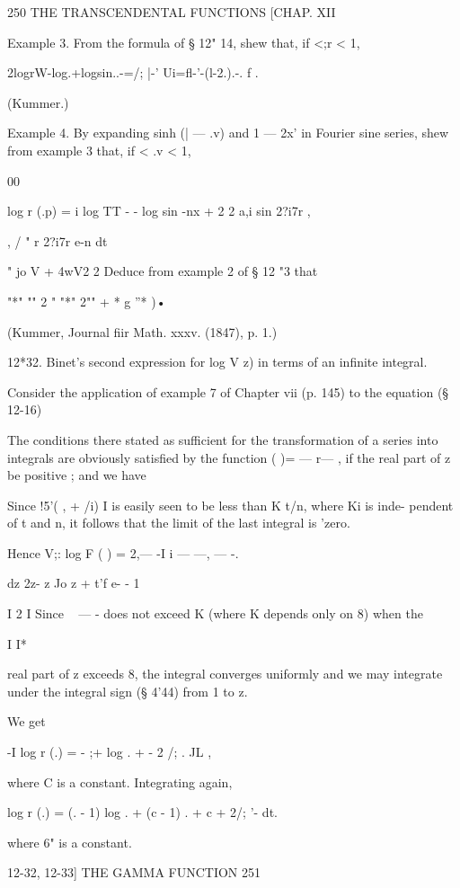250 THE TRANSCENDENTAL FUNCTIONS [CHAP. XII 

Example 3. From the formula of § 12" 14, shew that, if <;r < 1, 

2logrW-log.+logsin..-=/; |-' Ui=fl-'-(l-2.).-. f . 

(Kummer.) 

Example 4. By expanding sinh (| — .v)  and 1 — 2x' in Fourier sine series, shew from 
example 3 that, if < .v < 1, 

00 

log r (.p) = i log TT - -  log sin -nx + 2 2 a,i sin 2?i7r , 

, / " r 2?i7r e-n dt 

" jo V  + 4wV2 2%
Deduce from example 2 of § 12 "3 that 

"*" "" 2 "  "*"    2"" +  * g ''* )• 

(Kummer, Journal fiir Math. xxxv. (1847), p. 1.) 

12*32. Binet's second expression for log V  z) in terms of an infinite 
integral. 

Consider the application of example 7 of Chapter vii (p. 145) to the 
equation (§ 12-16) 

The conditions there stated as sufficient for the transformation of a 
series into integrals are obviously satisfied by the function  ( )= — r—  , 
if the real part of z be positive ; and we have 

Since !5'( ,   + /i) I is easily seen to be less than K t/n, where Ki is inde- 
pendent of t and n, it follows that the limit of the last integral is 'zero. 

Hence V;: log F ( ) = 2,— -I   i — —, — -. 

dz    2z- z Jo  z  + t'f e-  - 1 

I 2  I 
Since ~ — - does not exceed K (where K depends only on 8) when the 

I   I*   

real part of z exceeds 8, the integral converges uniformly and we may 
integrate under the integral sign (§ 4'44) from 1 to z. 

We get 

-I log r (.) = -  ;+ log . + - 2 /;   . JL , 

where C is a constant. Integrating again, 

log r (.) = (. - 1) log . + (c - 1) . + c + 2/; '-  dt. 

where 6" is a constant. 



12-32, 12-33] THE GAMMA FUNCTION 251 

